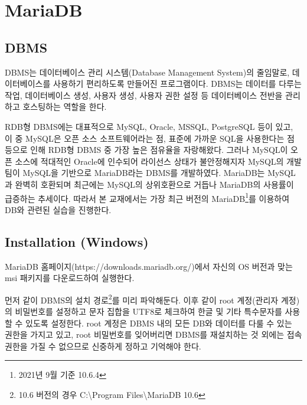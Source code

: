\section{MariaDB}\label{sect:maria-db}

\subsection*{DBMS}

DBMS는 데이터베이스 관리 시스템(Database Management System)의 줄임말로, 데이터베이스를 사용하기 편리하도록 만들어진 프로그램이다. DBMS는 데이터를 다루는 작업, 데이터베이스 생성, 사용자 생성, 사용자 권한 설정 등 데이터베이스 전반을 관리하고 호스팅하는 역할을 한다.

RDB형 DBMS에는 대표적으로 MySQL, Oracle, MSSQL, PostgreSQL 등이 있고, 이 중 MySQL은 오픈 소스 소프트웨어라는 점, 표준에 가까운 SQL을 사용한다는 점 등으로 인해 RDB형 DBMS 중 가장 높은 점유율을 자랑해왔다. 그러나 MySQL이 오픈 소스에 적대적인 Oracle에 인수되어 라이선스 상태가 불안정해지자 MySQL의 개발팀이 MySQL을 기반으로 MariaDB라는 DBMS를 개발하였다. MariaDB는 MySQL과 완벽히 호환되며 최근에는 MySQL의 상위호환으로 거듭나 MariaDB의 사용률이 급증하는 추세이다. 따라서 본 교재에서는 가장 최근 버전의 MariaDB\footnote{2021년 9월 기준 10.6.4}를 이용하여 DB와 관련된 실습을 진행한다.

\subsection*{Installation (Windows)}

MariaDB 홈페이지(https://downloads.mariadb.org/)에서 자신의 OS 버전과 맞는 msi 패키지를 다운로드하여 실행한다.


먼저 \과 같이 DBMS의 설치 경로\footnote{10.6 버전의 경우 C:\textbackslash{}Program Files\textbackslash{}MariaDB 10.6}를 미리 파악해둔다. 이후 \와 같이 root 계정(관리자 계정)의 비밀번호를 설정하고 문자 집합을 UTF8로 체크하여 한글 및 기타 특수문자를 사용할 수 있도록 설정한다. root 계정은 DBMS 내의 모든 DB와 데이터를 다룰 수 있는 권한을 가지고 있고, root 비밀번호를 잊어버리면 DBMS를 재설치하는 것 외에는 접속 권한을 가질 수 없으므로 신중하게 정하고 기억해야 한다. 

